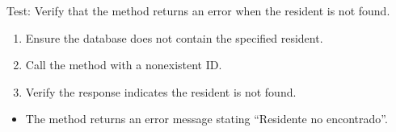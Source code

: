 \documentclass[letterpaper,10pt,english]{sphinxmanual}
\begin{document}
\begin{fulllineitems}
\label{\detokenize{test:test.test_residetnt.test_update_resident_surname_not_found}}
\pysigstartsignatures
\pysiglinewithargsret
{}
{}
{}
\pysigstopsignatures
\sphinxAtStartPar
Test: Verify that the method returns an error when the resident is not found.
\begin{description}
\begin{enumerate}
%
\item {} 
\sphinxAtStartPar
Ensure the database does not contain the specified resident.

\item {} 
\sphinxAtStartPar
Call the  method with a non\sphinxhyphen{}existent ID.

\item {} 
\sphinxAtStartPar
Verify the response indicates the resident is not found.

\end{enumerate}

\begin{itemize}
\item {} 
\sphinxAtStartPar
The method returns an error message stating “Residente no encontrado”.

\end{itemize}

\end{description}

\end{fulllineitems}

\end{document}
